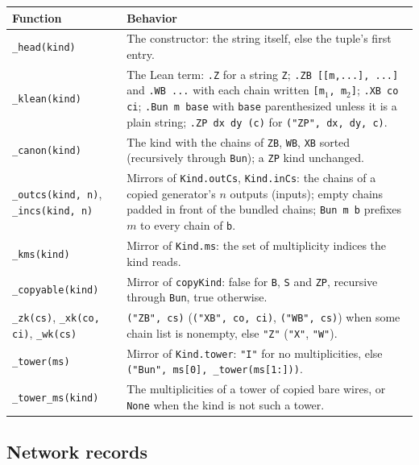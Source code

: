 {\begin{xltabular}{\linewidth}{@{}p{3.6cm}X@{}}
\toprule
Function & Behavior \\
\midrule
\texttt{\_\allowbreak{}head(kind)} & The constructor: the string itself, else the tuple's first entry. \\
\texttt{\_\allowbreak{}klean(kind)} & The Lean term: \texttt{.Z} for a string \texttt{Z};
  \texttt{.ZB [[m,...], ...]} and \texttt{.WB ...} with each chain written \texttt{[m$_1$, m$_2$]};
  \texttt{.XB co ci}; \texttt{.Bun m base} with \texttt{base} parenthesized unless it is a plain
  string; \texttt{.ZP dx dy (c)} for \texttt{("ZP", dx, dy, c)}. \\
\texttt{\_\allowbreak{}canon(kind)} & The kind with the chains of \texttt{ZB}, \texttt{WB}, \texttt{XB} sorted
  (recursively through \texttt{Bun}); a \texttt{ZP} kind unchanged. \\
\texttt{\_\allowbreak{}outcs(kind, n)}, \texttt{\_\allowbreak{}incs(kind, n)} & Mirrors of \texttt{Kind.outCs}, \texttt{Kind.inCs}: the
  chains of a copied generator's $n$ outputs (inputs); empty chains padded in front of the
  bundled chains; \texttt{Bun m b} prefixes $m$ to every chain of \texttt{b}. \\
\texttt{\_\allowbreak{}kms(kind)} & Mirror of \texttt{Kind.ms}: the set of multiplicity indices the kind reads. \\
\texttt{\_\allowbreak{}copyable(kind)} & Mirror of \texttt{copyKind}: false for \texttt{B}, \texttt{S} and \texttt{ZP}, recursive
  through \texttt{Bun}, true otherwise. \\
\texttt{\_\allowbreak{}zk(cs)}, \texttt{\_\allowbreak{}xk(co, ci)}, \texttt{\_\allowbreak{}wk(cs)} & \texttt{("ZB", cs)} (\texttt{("XB", co, ci)},
  \texttt{("WB", cs)}) when some chain list is nonempty, else \texttt{"Z"} (\texttt{"X"},
  \texttt{"W"}). \\
\texttt{\_\allowbreak{}tower(ms)} & Mirror of \texttt{Kind.tower}: \texttt{"I"} for no multiplicities, else
  \texttt{("Bun", ms[0], \_\allowbreak{}tower(ms[1:]))}. \\
\texttt{\_\allowbreak{}tower\_\allowbreak{}ms(kind)} & The multiplicities of a tower of copied bare wires, or \texttt{None} when the
  kind is not such a tower. \\
\bottomrule
\end{xltabular}

\subsection{Network records}\label{sec:lean-export-net-records}

}
